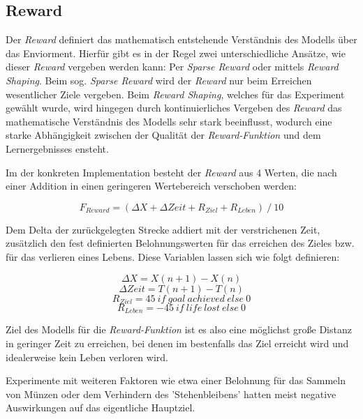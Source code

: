 \documentclass[sigconf,nonacm]{acmart}
\begin{document}
\subsection{Reward}
\label{reward}
Der \textit{Reward} definiert das mathematisch entstehende Verständnis des Modells über das Enviorment. Hierfür gibt es in der Regel zwei unterschiedliche Ansätze, wie dieser \textit{Reward} vergeben werden kann: Per \textit{Sparse Reward} oder mittels \textit{Reward Shaping}. Beim sog. \textit{Sparse Reward} wird der \textit{Reward} nur beim Erreichen wesentlicher Ziele vergeben. Beim \textit{Reward Shaping}, welches für das Experiment gewählt wurde, wird hingegen durch kontinuierliches Vergeben des \textit{Reward} das mathematische Verständnis des Modells sehr stark beeinflusst, wodurch eine starke Abhängigkeit zwischen der Qualität der \textit{Reward-Funktion} und dem Lernergebnisses ensteht.

Im der konkreten Implementation besteht der \textit{Reward} aus 4 Werten, die nach einer Addition in einen geringeren Wertebereich verschoben werden: 

\begin{equation}
F_{Reward}=(\Delta X+\Delta Zeit+R_{Ziel}+R_{Leben})\ /\ 10
\end{equation}\hfill \break

Dem Delta der zurückgelegten Strecke addiert mit der verstrichenen Zeit, zusätzlich den fest definierten Belohnungswerten für das erreichen des Zieles bzw. für das verlieren eines Lebens. Diese Variablen lassen sich wie folgt definieren:

\begin{equation}
\Delta X = X(n+1) - X(n)
\end{equation}
\begin{equation}
\Delta Zeit = T(n+1) - T(n)
\end{equation}
\begin{equation}
R_{Ziel} = 45\ if\ goal\ achieved\ else\ 0
\end{equation}
\begin{equation}
R_{Leben} = -45\  if\ life\ lost\ else\ 0
\end{equation}\hfill \break

Ziel des Modells für die \textit{Reward-Funktion} ist es also eine möglichst große Distanz in geringer Zeit zu erreichen, bei denen im bestenfalls das Ziel erreicht wird und idealerweise kein Leben verloren wird.

Experimente mit weiteren Faktoren wie etwa einer Belohnung für das Sammeln von Münzen oder dem Verhindern des 'Stehenbleibens' hatten meist negative Auswirkungen auf das eigentliche Hauptziel.
\end{document}
